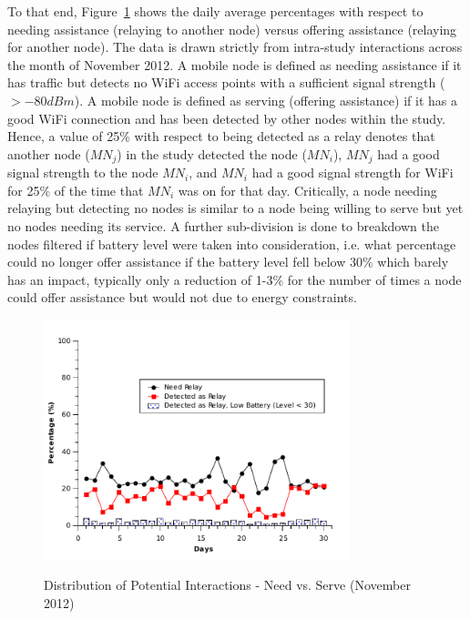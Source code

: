 To that end, Figure~\ref{fig:reciprocal} shows the daily average percentages with respect to needing assistance (relaying to another node) versus offering assistance (relaying for another node).  The data is drawn strictly from intra-study interactions across the month of November 2012.  A mobile node is defined as needing assistance if it has traffic but detects no WiFi access points with a sufficient signal strength ($> -80 dBm$).  A mobile node is defined as serving (offering assistance) if it has a good WiFi connection and has been detected by other nodes within the study.  Hence, a value of 25\% with respect to being detected as a relay denotes that another node ($MN_j$) in the study detected the node ($MN_i$), $MN_j$ had a good signal strength to the node $MN_i$, and $MN_i$ had a good signal strength for WiFi for 25\% of the time that $MN_i$ was on for that day.  Critically, a node needing relaying but detecting no nodes is similar to a node being willing to serve but yet no nodes needing its service. A further sub-division is done to breakdown the nodes filtered if battery level were taken into consideration, i.e. what percentage could no longer offer assistance if the battery level fell below 30\% which barely has an impact, typically only a reduction of 1-3\% for the number of times a node could offer assistance but would not due to energy constraints.   

\begin{figure}[tbp]
\centering 
{\includegraphics[width=3.5in]{graphs/reciprocal.pdf}}
\caption{Distribution of Potential Interactions - Need vs. Serve (November 2012)} 
\label{fig:reciprocal}
\end{figure} 

